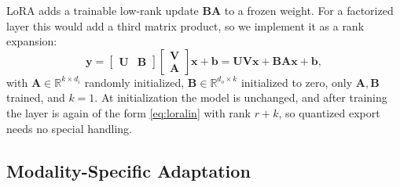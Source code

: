 \documentclass[journal]{IEEEtran}
\newcommand{\R}{\mathbb{R}}
\newcommand{\vect}[1]{\bm{#1}}
\begin{document}
LoRA adds a trainable low-rank update $\vect{B}\vect{A}$ to a frozen weight. For a factorized layer this would add a third matrix product, so we implement it as a rank expansion:
\begin{equation}
  \vect{y} = \begin{bmatrix} \vect{U} & \vect{B} \end{bmatrix} \begin{bmatrix} \vect{V} \\ \vect{A} \end{bmatrix} \vect{x} + \vect{b} = \vect{U}\vect{V}\vect{x} + \vect{B}\vect{A}\vect{x} + \vect{b},
  \label{eq:lora}
\end{equation}
with $\vect{A}\in\R^{k\times d_i}$ randomly initialized, $\vect{B}\in\R^{d_o\times k}$ initialized to zero, only $\vect{A},\vect{B}$ trained, and $k=1$. At initialization the model is unchanged, and after training the layer is again of the form \eqref{eq:loralin} with rank $r+k$, so quantized export needs no special handling.

\subsection{Modality-Specific Adaptation}
\label{sec:modspec}
\end{document}
